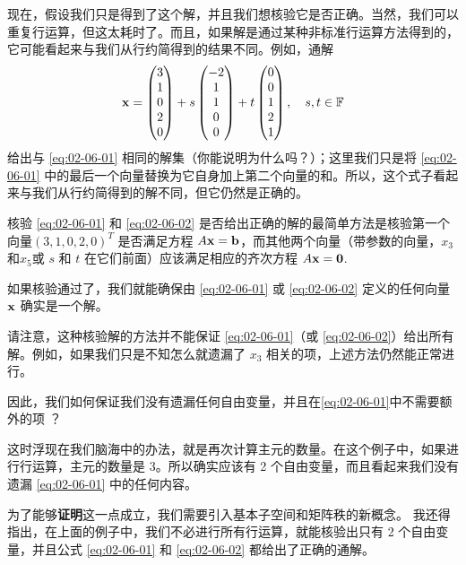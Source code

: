 现在，假设我们只是得到了这个解，并且我们想核验它是否正确。当然，我们可以重复行运算，但这太耗时了。而且，如果解是通过某种非标准行运算方法得到的，它可能看起来与我们从行约简得到的结果不同。例如，通解
\begin{equation}\label{eq:02-06-02}
\mathbf{x} = \begin{pmatrix} 3 \\ 1 \\ 0 \\ 2 \\ 0 \end{pmatrix} + s \begin{pmatrix} -2 \\ 1 \\ 1 \\ 0 \\ 0 \end{pmatrix} + t \begin{pmatrix} 0 \\ 0 \\ 1 \\ 2 \\ 1 \end{pmatrix}, \quad s, t \in \mathbb{F}
\end{equation}
给出与 \eqref{eq:02-06-01} 相同的解集（你能说明为什么吗？）；这里我们只是将 \eqref{eq:02-06-01} 中的最后一个向量替换为它自身加上第二个向量的和。所以，这个式子看起来与我们从行约简得到的解不同，但它仍然是正确的。

核验 \eqref{eq:02-06-01} 和 \eqref{eq:02-06-02} 是否给出正确的解的最简单方法是核验第一个向量$(3, 1, 0, 2, 0)^T$ 是否满足方程 $A \mathbf{x} = \mathbf{b}$，而其他两个向量（带参数的向量，$x_3$ 和$x_5$或 $s$ 和 $t$ 在它们前面）应该满足相应的齐次方程 $A \mathbf{x} = \mathbf{0}$. ~

如果核验通过了，我们就能确保由 \eqref{eq:02-06-01} 或 \eqref{eq:02-06-02} 定义的任何向量 $\mathbf{x}$ 确实是一个解。

请注意，这种核验解的方法并不能保证 \eqref{eq:02-06-01}（或 \eqref{eq:02-06-02}）给出所有解。例如，如果我们只是不知怎么就遗漏了 $x_3$ 相关的项，上述方法仍然能正常进行。

因此，我们如何保证我们没有遗漏任何自由变量，并且在\eqref{eq:02-06-01}中不需要额外的项 ？

这时浮现在我们脑海中的办法，就是再次计算主元的数量。在这个例子中，如果进行行运算，主元的数量是 3。所以确实应该有 2 个自由变量，而且看起来我们没有遗漏 \eqref{eq:02-06-01} 中的任何内容。

为了能够\textbf{证明}这一点成立，我们需要引入基本子空间和矩阵秩的新概念。
我还得指出，在上面的例子中，我们不必进行所有行运算，就能核验出只有 2 个自由变量，并且公式 \eqref{eq:02-06-01} 和 \eqref{eq:02-06-02} 都给出了正确的通解。

